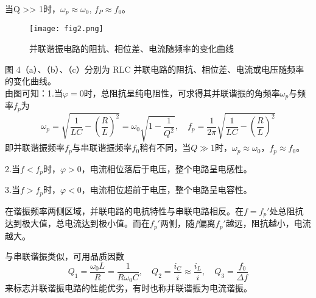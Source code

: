 \documentclass[UTF-8,twoside,cs4size]{ctexart}
\begin{document}
当Q >> 1时，$\omega _p\approx \omega _0$, $f_P\approx f_0$。
\begin{figure}[!h]
    \centering
    \texttt{[image: fig2.png]}
    \caption{并联谐振电路的阻抗、相位差、电流随频率的变化曲线}
\end{figure}
图 4（a）、（b）、（c）分别为 RLC 并联电路的阻抗、相位差、电流或电压随频率的变化曲线。\\
由图可知：1.当$ \varphi=0 $时，总阻抗呈纯电阻性，可求得其并联谐振的角频率$ \omega_p $与频率$ f_p $为
	\[\omega_p=\sqrt{\frac{1}{LC}-\left(\frac RL\right)^2}=\omega_0\sqrt{1-\frac{1}{Q^2}},\quad f_p=\frac{1}{2\pi}\sqrt{\frac{1}{LC}-\left(\frac RL\right)^2}\]
	即并联谐振频率$ f_p $与串联谐振频率$ f_0 $稍有不同，当$ Q\gg 1 $时，$ \omega_p\approx\omega_0 $，$ f_p\approx f_0 $。
	
	2.当$ f<f_p $时，$ \varphi>0 $，电流相位落后于电压，整个电路呈电感性。
	
	3.当$ f>f_p $时，$ \varphi<0 $，电流相位超前于电压，整个电路呈电容性。
	
	在谐振频率两侧区域，并联电路的电抗特性与串联电路相反。在$ f=f_p' $处总阻抗达到极大值，总电流达到极小值。而在$ f_p' $两侧，随$ f $偏离$ f_p' $越远，阻抗越小，电流越大。
	
	与串联谐振类似，可用品质因数
	\[Q_1=\frac{\omega_0L}{R}=\frac{1}{R\omega_0C},\quad Q_2=\frac{i_C}{i}\approx\frac{i_L}{i},\quad Q_3=\frac{f_0}{\Delta f}\]
	来标志并联谐振电路的性能优劣，有时也称并联谐振为电流谐振。
\end{document}
